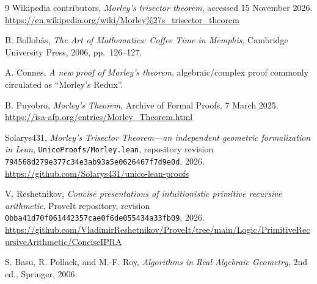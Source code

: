 \documentclass[11pt]{article}
\theoremstyle{definition}
\newcommand{\code}[1]{\texttt{#1}}
\begin{document}
\begingroup
\raggedright
\begin{thebibliography}{9}
Wikipedia contributors,
\emph{Morley's trisector theorem}, accessed 15 November 2026.
\url{https://en.wikipedia.org/wiki/Morley%27s_trisector_theorem}

B. Bollob\'as,
\emph{The Art of Mathematics: Coffee Time in Memphis},
Cambridge University Press, 2006, pp.~126--127.

A. Connes,
\emph{A new proof of Morley's theorem},
algebraic/complex proof commonly circulated as ``Morley's Redux''.

B. Puyobro,
\emph{Morley's Theorem}, Archive of Formal Proofs, 7 March 2025.
\url{https://isa-afp.org/entries/Morley_Theorem.html}

Solarys431,
\emph{Morley's Trisector Theorem---an independent geometric formalization in
Lean}, \code{UnicoProofs/Morley.lean}, repository revision
\code{794568d279e377c34e3ab93a5e0626467f7d9e0d}, 2026.
\url{https://github.com/Solarys431/unico-lean-proofs}

V. Reshetnikov,
\emph{Concise presentations of intuitionistic primitive recursive arithmetic},
ProveIt repository, revision
\code{0bba41d70f061442357cae0f6de055434a33fb09}, 2026.
\url{https://github.com/VladimirReshetnikov/ProveIt/tree/main/Logic/PrimitiveRecursiveArithmetic/ConciseIPRA}

S. Basu, R. Pollack, and M.-F. Roy,
\emph{Algorithms in Real Algebraic Geometry}, 2nd ed., Springer, 2006.
\end{thebibliography}
\endgroup
\end{document}
